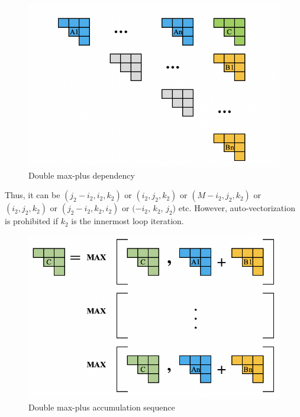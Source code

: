 \begin{figure}[htbp]
\begin{adjustbox}{varwidth=\textwidth,margin=0 {\abovecaptionskip} 0 0, frame=0.00pt}
\centerline{\includegraphics[scale=.74]{double_max_plus_dependence.png}}
\end{adjustbox}
\caption{Double max-plus dependency}
\label{fig:double_plus_dependencies}
\end{figure}
Thus, it can be $(j_{2}-i_{2}, i_{2}, k_{2})$ or $(i_{2}, j_{2}, k_{2})$ or $(M-i_{2}, j_{2}, k_{2})$ or $(i_{2}, j_{2}, k_{2})$ or $(j_{2}-i_{2}, k_{2}, i_{2})$ or $(-i_{2}$, $k_{2}$, $j_{2}$) etc.  However, auto-vectorization is prohibited if $k_{2}$ is the innermost loop iteration. 
\begin{figure}[htbp]
\begin{adjustbox}{varwidth=\textwidth,margin=0 {\abovecaptionskip} 0 0, frame=0.00pt}
\centerline{\includegraphics[scale=.74]{double_max_plus_accumulation_sequence.png}}
\end{adjustbox}
\caption{Double max-plus accumulation sequence}
\label{fig:double_max_plus_accumulation_sequence}
\end{figure}
